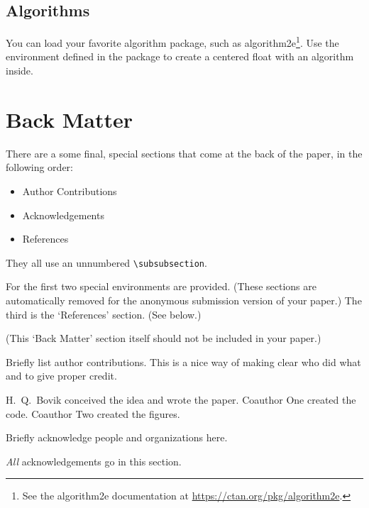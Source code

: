 \documentclass{uai2021} %
\begin{document}
\subsection{Algorithms}\label{sec:algorithms}
You can load your favorite algorithm package, such as \textsf{algorithm2e}\footnote{See the \textsf{algorithm2e} documentation at \url{https://ctan.org/pkg/algorithm2e}.}.
Use the environment defined in the package to create a centered float with an algorithm inside.

\section{Back Matter}
There are a some final, special sections that come at the back of the paper, in the following order:
\begin{itemize}
  \item Author Contributions
  \item Acknowledgements
  \item References
\end{itemize}
They all use an unnumbered \verb|\subsubsection|.

For the first two special environments are provided.
(These sections are automatically removed for the anonymous submission version of your paper.)
The third is the ‘References’ section.
(See below.)

(This ‘Back Matter’ section itself should not be included in your paper.)

\begin{contributions} %
    Briefly list author contributions.
    This is a nice way of making clear who did what and to give proper credit.

    H.~Q.~Bovik conceived the idea and wrote the paper.
    Coauthor One created the code.
    Coauthor Two created the figures.
\end{contributions}

\begin{acknowledgements} %
    Briefly acknowledge people and organizations here.

    \emph{All} acknowledgements go in this section.
\end{acknowledgements}
\end{document}
